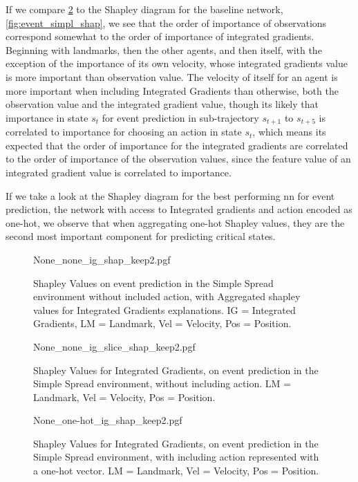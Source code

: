 \documentclass[UKenglish]{uiomasterthesis}
\begin{document}
If we compare \cref{fig:event_simpl_ig_slice} to the Shapley diagram for the baseline network, \cref{fig:event_simpl_shap}, we see that the order of importance of observations correspond somewhat to the order of importance of integrated gradients. Beginning with landmarks, then the other agents, and then itself, with the exception of the importance of its own velocity, whose integrated gradients value is more important than observation value.
The velocity of itself for an agent is more important when including Integrated Gradients than otherwise, both the observation value and the integrated gradient value, though its likely that importance in state $s_t$ for event prediction in sub-trajectory $s_{t+1}$ to $s_{t+5}$ is correlated to importance for choosing an action in state $s_t$, which means its expected that the order of importance for the integrated gradients are correlated to the order of importance of the observation values, since the feature value of an integrated gradient value is correlated to importance.

If we take a look at the Shapley diagram for the best performing \ac{nn} for event prediction, the network with access to Integrated gradients and action encoded as one-hot, we observe that when aggregating one-hot Shapley values, they are the second most important component for predicting critical states. 

\begin{figure}[hbtp]
    \centering
{None_none_ig_shap_keep2.pgf}
\caption{Shapley Values on event prediction in the Simple Spread environment without included action, with Aggregated shapley values for Integrated Gradients explanations. IG = Integrated Gradients, LM = Landmark, Vel = Velocity, Pos = Position.}
\label{fig:event_simpl_ig_shap}
\end{figure}

\begin{figure}[hbtp]
\centering
{None_none_ig_slice_shap_keep2.pgf}
\caption{Shapley Values for Integrated Gradients, on event prediction in the Simple Spread environment, without including action. LM = Landmark, Vel = Velocity, Pos = Position.}
\label{fig:event_simpl_ig_slice}
\end{figure}

\begin{figure}[hbtp]
    \centering
{None_one-hot_ig_shap_keep2.pgf}
\caption{Shapley Values for Integrated Gradients, on event prediction in the Simple Spread environment, with including action represented with a one-hot vector. LM = Landmark, Vel = Velocity, Pos = Position.}
\label{fig:event_simpl_one-hot_ig_shap}
\end{figure}
\end{document}
